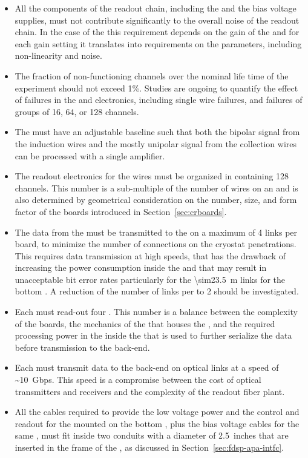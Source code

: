 \begin{itemize}
{at  to measure the power density required to generate
bubbles inside  at a depth corresponding
to that of the  mounted on the bottom .}
\item{All the components of the readout chain, including the 
and the bias voltage supplies, must not contribute significantly to
the overall noise of the readout chain. In the case of the 
this requirement depends on the gain of the  and
for each gain setting it translates into requirements on
the  parameters, including non-linearity and noise.}
\item{The fraction of non-functioning channels over the \dunelifetime
nominal life time of the  experiment should not
exceed 1\%. Studies are ongoing to quantify the effect of failures
in the  and electronics, including
single wire failures, and failures of groups of
\num{16}, \num{64}, or \num{128} channels.}
\item{The  must have an adjustable baseline such that both the
bipolar signal from the induction wires and the mostly unipolar signal 
from the collection wires can be processed with a single amplifier.}
\item{The readout electronics for the  wires must be organized
in  containing 128 channels. This number is a sub-multiple
of the number of wires on an  and is also determined
by geometrical consideration on the number, size, and form
factor of the  boards introduced in Section~\ref{sec:crboards}.}
\item{The data from the  must be transmitted to the
 on a maximum of 4 links per board, to minimize
the number of connections on the cryostat penetrations. This 
requires data transmission at high speeds, that has the drawback
of increasing the power consumption inside the  and
that may result in unacceptable bit error rates particularly for the 
\SI{\sim23.5}{m} links for the bottom . A reduction of
the number of links per  to 2 should be investigated.}
\item{Each  must read-out four . This number
is a balance between the complexity of the boards, the mechanics
of the  that houses the , and the 
required processing power in the  inside the
 that is used to further serialize the data 
before transmission to the  back-end.}
\item{Each  must transmit data to the 
back-end on optical links at a speed of \SI{~10}{Gbps}. This speed 
is a compromise between the cost of optical transmitters and
receivers and the complexity of the readout fiber plant.}
\item{All the cables required to provide the low voltage power
and the control and readout for the  mounted on
the bottom , plus the bias voltage cables for
the same , must fit inside two conduits with a
diameter of \SI{2.5}{inches} that are inserted in the frame of
the , as discussed in Section~\ref{sec:fdsp-apa-intfc}.}
\end{itemize}

